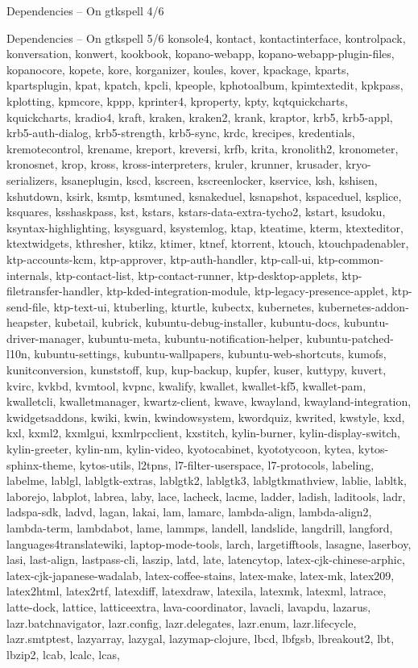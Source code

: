 \documentclass{beamer}
\begin{document}
\begin{frame}{Dependencies – On gtkspell 4/6}
\end{frame}

\begin{frame}{Dependencies – On gtkspell 5/6}
\tiny konsole4, kontact, kontactinterface, kontrolpack, konversation, konwert, kookbook, kopano-webapp, kopano-webapp-plugin-files, kopanocore, kopete, kore, korganizer, koules, kover, kpackage, kparts, kpartsplugin, kpat, kpatch, kpcli, kpeople, kphotoalbum, kpimtextedit, kpkpass, kplotting, kpmcore, kppp, kprinter4, kproperty, kpty, kqtquickcharts, kquickcharts, kradio4, kraft, kraken, kraken2, krank, kraptor, krb5, krb5-appl, krb5-auth-dialog, krb5-strength, krb5-sync, krdc, krecipes, kredentials, kremotecontrol, krename, kreport, kreversi, krfb, krita, kronolith2, kronometer, kronosnet, krop, kross, kross-interpreters, kruler, krunner, krusader, kryo-serializers, ksaneplugin, kscd, kscreen, kscreenlocker, kservice, ksh, kshisen, kshutdown, ksirk, ksmtp, ksmtuned, ksnakeduel, ksnapshot, kspaceduel, ksplice, ksquares, ksshaskpass, kst, kstars, kstars-data-extra-tycho2, kstart, ksudoku, ksyntax-highlighting, ksysguard, ksystemlog, ktap, kteatime, kterm, ktexteditor, ktextwidgets, kthresher, ktikz, ktimer, ktnef, ktorrent, ktouch, ktouchpadenabler, ktp-accounts-kcm, ktp-approver, ktp-auth-handler, ktp-call-ui, ktp-common-internals, ktp-contact-list, ktp-contact-runner, ktp-desktop-applets, ktp-filetransfer-handler, ktp-kded-integration-module, ktp-legacy-presence-applet, ktp-send-file, ktp-text-ui, ktuberling, kturtle, kubectx, kubernetes, kubernetes-addon-heapster, kubetail, kubrick, kubuntu-debug-installer, kubuntu-docs, kubuntu-driver-manager, kubuntu-meta, kubuntu-notification-helper, kubuntu-patched-l10n, kubuntu-settings, kubuntu-wallpapers, kubuntu-web-shortcuts, kumofs, kunitconversion, kunststoff, kup, kup-backup, kupfer, kuser, kuttypy, kuvert, kvirc, kvkbd, kvmtool, kvpnc, kwalify, kwallet, kwallet-kf5, kwallet-pam, kwalletcli, kwalletmanager, kwartz-client, kwave, kwayland, kwayland-integration, kwidgetsaddons, kwiki, kwin, kwindowsystem, kwordquiz, kwrited, kwstyle, kxd, kxl, kxml2, kxmlgui, kxmlrpcclient, kxstitch, kylin-burner, kylin-display-switch, kylin-greeter, kylin-nm, kylin-video, kyotocabinet, kyototycoon, kytea, kytos-sphinx-theme, kytos-utils, l2tpns, l7-filter-userspace, l7-protocols, labeling, labelme, lablgl, lablgtk-extras, lablgtk2, lablgtk3, lablgtkmathview, lablie, labltk, laborejo, labplot, labrea, laby, lace, lacheck, lacme, ladder, ladish, laditools, ladr, ladspa-sdk, ladvd, lagan, lakai, lam, lamarc, lambda-align, lambda-align2, lambda-term, lambdabot, lame, lammps, landell, landslide, langdrill, langford, languages4translatewiki, laptop-mode-tools, larch, largetifftools, lasagne, laserboy, lasi, last-align, lastpass-cli, laszip, latd, late, latencytop, latex-cjk-chinese-arphic, latex-cjk-japanese-wadalab, latex-coffee-stains, latex-make, latex-mk, latex209, \alert{latex2html}, latex2rtf, latexdiff, latexdraw, latexila, latexmk, latexml, latrace, latte-dock, lattice, latticeextra, lava-coordinator, lavacli, lavapdu, lazarus, lazr.batchnavigator, lazr.config, lazr.delegates, lazr.enum, lazr.lifecycle, lazr.smtptest, lazyarray, lazygal, lazymap-clojure, lbcd, lbfgsb, lbreakout2, lbt, lbzip2, lcab, lcalc, lcas, 
\end{frame}
\end{document}

